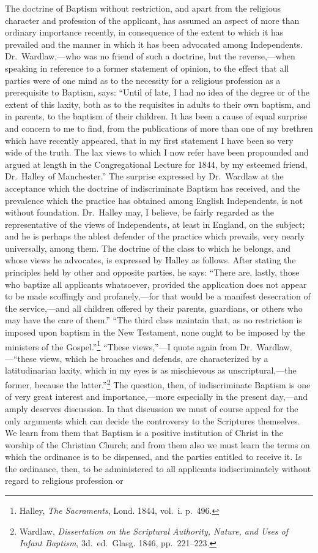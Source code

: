 \documentclass[
  english,
]{book}
\begin{document}
The doctrine of Baptism without restriction, and apart from the religious character and profession of the applicant, has assumed an aspect of more than ordinary importance recently, in consequence of the extent to which it has prevailed and the manner in which it has been advocated among Independents. Dr.~Wardlaw,---who was no friend of such a doctrine, but the reverse,---when speaking in reference to a former statement of opinion, to the effect that all parties were of one mind as to the necessity for a religious profession as a prerequisite to Baptism, says: ``Until of late, I had no idea of the degree or of the extent of this laxity, both as to the requisites in adults to their own baptism, and in parents, to the baptism of their children. It has been a cause of equal surprise and concern to me to find, from the publications of more than one of my brethren which have recently appeared, that in my first statement I have been so very wide of the truth. The lax views to which I now refer have been propounded and argued at length in the Congregational Lecture for 1844, by my esteemed friend, Dr.~Halley of Manchester.'' The surprise expressed by Dr.~Wardlaw at the acceptance which the doctrine of indiscriminate Baptism has received, and the prevalence which the practice has obtained among English Independents, is not without foundation. Dr.~Halley may, I believe, be fairly regarded as the representative of the views of Independents, at least in England, on the subject; and he is perhaps the ablest defender of the practice which prevails, very nearly universally, among them. The doctrine of the class to which he belongs, and whose views he advocates, is expressed by Halley as follows. After stating the principles held by other and opposite parties, he says: ``There are, lastly, those who baptize all applicants whatsoever, provided the application does not appear to be made scoffingly and profanely,---for that would be a manifest desecration of the service,---and all children offered by their parents, guardians, or others who may have the care of them.'' ``The third class maintain that, as no restriction is imposed upon baptism in the New Testament, none ought to be imposed by the ministers of the Gospel.''\footnote{Halley, \emph{The Sacraments}, Lond. 1844, vol.~i. p.~496.} ``These views,''---I quote again from Dr.~Wardlaw,---``these views, which he broaches and defends, are characterized by a latitudinarian laxity, which in my eyes is as mischievous as unscriptural,---the former, because the latter.''\footnote{Wardlaw, \emph{Dissertation on the Scriptural Authority, Nature, and Uses of Infant Baptism}, 3d.~ed.~Glasg. 1846, pp.~221--223.} The question, then, of indiscriminate Baptism is one of very great interest and importance,---more especially in the present day,---and amply deserves discussion. In that discussion we must of course appeal for the only arguments which can decide the controversy to the Scriptures themselves. We learn from them that Baptism is a positive institution of Christ in the worship of the Christian Church; and from them also we must learn the terms on which the ordinance is to be dispensed, and the parties entitled to receive it. Is the ordinance, then, to be administered to all applicants indiscriminately without regard to religious profession or 
\end{document}
